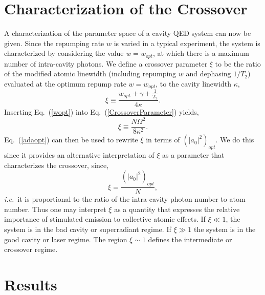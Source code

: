 \documentclass[aps,
twocolumn,
superscriptaddress,groupedaddress]{revtex4}
\begin{document}
\section{Characterization of the Crossover}
\label{sec:CrossoverCharacterization}

A characterization of the parameter space of a cavity QED system can
now be given. Since the repumping rate $w$ is varied in a typical
experiment, the system is characterized by considering the value
$w=w_{opt}$, at which there is a maximum number of intra-cavity
photons. We define a crossover parameter $\xi$ to be the ratio of the
modified atomic linewidth (including repumping $w$ and dephasing
$1/T_2$) evaluated at the optimum repump rate $w=w_{opt}$, to the
cavity linewidth $\kappa$,
\begin{equation}
\xi\equiv\frac{ w_{opt}+\gamma+\frac{1}{T_2}}{4\kappa}.
\label{CrossoverParameter}
\end{equation}
Inserting Eq.~(\ref{wopt}) into  Eq.~(\ref{CrossoverParameter}) yields,
\begin{equation}
\xi\equiv \frac{N \Omega^2}{8\kappa^2}.
\label{CrossoverParameter2}
\end{equation}
Eq.~(\ref{adaopt}) can then be used to rewrite $\xi$ in terms of
$(|a_0|^2)_{opt}$. We do this since it provides an alternative
interpretation of $\xi$ as a parameter that characterizes the
crossover, since,
\begin{equation}
\xi = \frac{(|a_0|^2)_{opt}}{N},
\end{equation}
{\em i.e.}\ it is proportional to the ratio of the intra-cavity photon
number to atom number. Thus one may interpret $\xi$ as a quantity that
expresses the relative importance of stimulated emission to collective
atomic effects. If $\xi\ll1$, the system is in the bad cavity or superradiant
regime. If $\xi\gg1$ the system is in the good cavity or laser
regime. The region $\xi\sim1$ defines the intermediate or crossover regime.

\section{Results}
\label{sec:Results}
\end{document}
